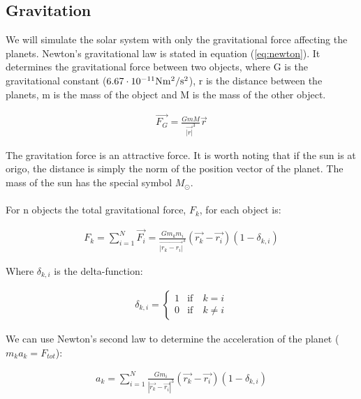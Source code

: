 %









\subsection{Gravitation}

We will simulate the solar system with only the gravitational force affecting the planets.  Newton's gravitational law is stated in equation (\ref{eq:newton})\cite{uniphys}. It determines the gravitational force between two objects, where G is the gravitational constant ($6.67 \cdot 10^{-11} \rm{Nm^2/s^2}$), r is the distance between the planets, m is the mass of the object and M is the mass of the other object.

\begin{align}
	\vec{F_G}  =\frac{GmM}{\vec{|r|}^3}\vec{r}
	\label{eq:newton}
\end{align}

The gravitation force is an attractive force. It is worth noting that if the sun is at origo, the distance is simply the norm of the position vector of the planet. The mass of the sun has the special symbol $M_{\odot}$. 
\\
\\
For n objects the total gravitational force, $F_k$, for each object is: 


\begin{align}
	F_k = 
	\sum_{i = 1}^{N}
	\vec{F_i}  
	=
	\frac{Gm_km_i}
	{\vec{|r_k - r_i|}^3}
	(\vec{r_k} - \vec{r_i})
	(1 - \delta_{k,i})
	\label{eq:newton_all}
\end{align}

Where $\delta_{k,i}$ is the delta-function:

\begin{align*}
	\delta_{k,i} = \left\{\begin{matrix}
					1 & \text{if} \quad k =  i\\
					0 & \text{if} \quad k \neq i 
					\end{matrix}\right.
\end{align*}



We can use Newton's second law to determine the acceleration of the planet ($m_ka_k= F_{tot}$):

\begin{align}
	a_k
	=
	\sum_{i = 1}^{N}
	\frac{Gm_i}
	{|\vec{r_k} - \vec{r_i}|^3}
	(\vec{r_k} - \vec{r_i})
	(1 - \delta_{k,i})
	\label{eq:acceleration_all}
\end{align}














